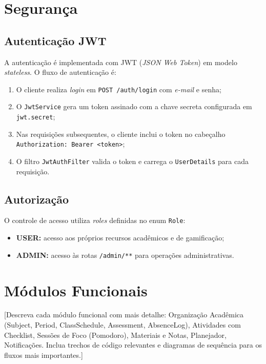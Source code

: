 \section{Segurança}
\label{sec:seguranca}

\subsection{Autenticação JWT}
\label{subsec:auth-jwt}

A autenticação é implementada com JWT (\textit{JSON Web Token}) em modelo
\textit{stateless}. O fluxo de autenticação é:

\begin{enumerate}
  \item O cliente realiza \textit{login} em \texttt{POST /auth/login} com
        \textit{e-mail} e senha;
  \item O \texttt{JwtService} gera um token assinado com a chave secreta
        configurada em \texttt{jwt.secret};
  \item Nas requisições subsequentes, o cliente inclui o token no cabeçalho
        \texttt{Authorization: Bearer <token>};
  \item O filtro \texttt{JwtAuthFilter} valida o token e carrega o
        \texttt{UserDetails} para cada requisição.
\end{enumerate}

\subsection{Autorização}
\label{subsec:autorizacao}

O controle de acesso utiliza \textit{roles} definidas no enum \texttt{Role}:

\begin{itemize}
  \item \textbf{USER:} acesso aos próprios recursos acadêmicos e de gamificação;
  \item \textbf{ADMIN:} acesso às rotas \texttt{/admin/**} para operações
        administrativas.
\end{itemize}

\section{Módulos Funcionais}
\label{sec:modulos}

[Descreva cada módulo funcional com mais detalhe: Organização Acadêmica
(Subject, Period, ClassSchedule, Assessment, AbsenceLog), Atividades com Checklist,
Sessões de Foco (Pomodoro), Materiais e Notas, Planejador, Notificações.
Inclua trechos de código relevantes e diagramas de sequência para os fluxos
mais importantes.]

